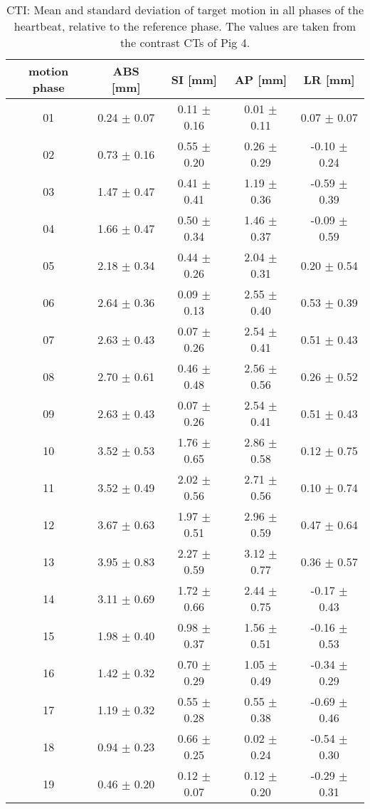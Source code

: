 \newpage

\begin{table}[H]
  \centering
  \scriptsize
  \caption{CTI: Mean and standard deviation of target motion in all phases of the heartbeat, relative to the reference phase. The values are 
  taken from the contrast CTs of Pig 4.}
  \begin{tabular}{|c|c|c|c|c|}
    \hline\hline
    motion phase\rule{0pt}{2.6ex}\rule[-1.2ex]{0pt}{0pt} & ABS [mm] & SI [mm] & AP [mm] & LR [mm]\\
    \hline
01 &0.24 $\pm$ 0.07 &0.11 $\pm$ 0.16 &0.01 $\pm$ 0.11 &0.07 $\pm$ 0.07 \\
02 &0.73 $\pm$ 0.16 &0.55 $\pm$ 0.20 &0.26 $\pm$ 0.29 &-0.10 $\pm$ 0.24 \\
03 &1.47 $\pm$ 0.47 &0.41 $\pm$ 0.41 &1.19 $\pm$ 0.36 &-0.59 $\pm$ 0.39 \\
04 &1.66 $\pm$ 0.47 &0.50 $\pm$ 0.34 &1.46 $\pm$ 0.37 &-0.09 $\pm$ 0.59 \\
05 &2.18 $\pm$ 0.34 &0.44 $\pm$ 0.26 &2.04 $\pm$ 0.31 &0.20 $\pm$ 0.54 \\
06 &2.64 $\pm$ 0.36 &0.09 $\pm$ 0.13 &2.55 $\pm$ 0.40 &0.53 $\pm$ 0.39 \\
07 &2.63 $\pm$ 0.43 &0.07 $\pm$ 0.26 &2.54 $\pm$ 0.41 &0.51 $\pm$ 0.43 \\
08 &2.70 $\pm$ 0.61 &0.46 $\pm$ 0.48 &2.56 $\pm$ 0.56 &0.26 $\pm$ 0.52 \\
09 &2.63 $\pm$ 0.43 &0.07 $\pm$ 0.26 &2.54 $\pm$ 0.41 &0.51 $\pm$ 0.43 \\
10 &3.52 $\pm$ 0.53 &1.76 $\pm$ 0.65 &2.86 $\pm$ 0.58 &0.12 $\pm$ 0.75 \\
11 &3.52 $\pm$ 0.49 &2.02 $\pm$ 0.56 &2.71 $\pm$ 0.56 &0.10 $\pm$ 0.74 \\
12 &3.67 $\pm$ 0.63 &1.97 $\pm$ 0.51 &2.96 $\pm$ 0.59 &0.47 $\pm$ 0.64 \\
13 &3.95 $\pm$ 0.83 &2.27 $\pm$ 0.59 &3.12 $\pm$ 0.77 &0.36 $\pm$ 0.57 \\
14 &3.11 $\pm$ 0.69 &1.72 $\pm$ 0.66 &2.44 $\pm$ 0.75 &-0.17 $\pm$ 0.43 \\
15 &1.98 $\pm$ 0.40 &0.98 $\pm$ 0.37 &1.56 $\pm$ 0.51 &-0.16 $\pm$ 0.53 \\
16 &1.42 $\pm$ 0.32 &0.70 $\pm$ 0.29 &1.05 $\pm$ 0.49 &-0.34 $\pm$ 0.29 \\
17 &1.19 $\pm$ 0.32 &0.55 $\pm$ 0.28 &0.55 $\pm$ 0.38 &-0.69 $\pm$ 0.46 \\
18 &0.94 $\pm$ 0.23 &0.66 $\pm$ 0.25 &0.02 $\pm$ 0.24 &-0.54 $\pm$ 0.30 \\
19 &0.46 $\pm$ 0.20 &0.12 $\pm$ 0.07 &0.12 $\pm$ 0.20 &-0.29 $\pm$ 0.31 \\
    \hline\hline
  \end{tabular}
  \label{tab:motion:CTI:Pig4}
\end{table}


